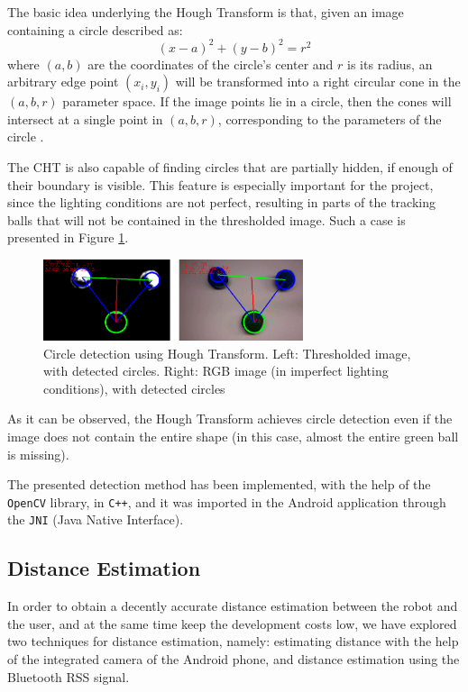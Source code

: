 \documentclass[journal]{IEEEtran}
\let\MYoriglatexcaption\caption
\renewcommand{\caption}[2][\relax]{\MYoriglatexcaption[#2]{#2}}
\begin{document}
The basic idea underlying the Hough Transform is that, given an image containing a circle described as:
%
\begin{equation}
\left(x-a\right)^2 + \left(y-b\right)^2 = r^2
\end{equation}
where $(a,b)$ are the coordinates of the circle's center and $r$ is its radius, an arbitrary edge point $(x_i, y_i)$ will be transformed into a right circular cone in the $(a,b,r)$ parameter space. If the image points lie in a circle, then the cones will intersect at a single point in $(a,b,r)$, corresponding to the parameters of the circle \cite{yuen1990cht}.

The CHT is also capable of finding circles that are partially hidden, if enough of their boundary is visible. This feature is especially important for the project, since the lighting conditions are not perfect, resulting in parts of the tracking balls that will not be contained in the thresholded image. Such a case is presented in Figure \ref{fig:cht}.
%
\begin{figure}[htpb]
 \centering
\includegraphics[width=3in]{images/cht_incomplete}
\caption{Circle detection using Hough Transform. Left: Thresholded image, with detected circles. Right: RGB image (in imperfect lighting conditions), with detected circles}
\label{fig:cht}
\end{figure}
%
As it can be observed, the Hough Transform achieves circle detection even if the image does not contain the entire shape (in this case, almost the entire green ball is missing).

The presented detection method has been implemented, with the help of the \texttt{OpenCV} library, in \texttt{C++}, and it was imported in the Android application through the \texttt{JNI} (Java Native Interface).

\subsection{Distance Estimation}
In order to obtain a decently accurate distance estimation between the robot and the user, and at the same time keep the development costs low, we have explored two techniques for distance estimation, namely: estimating distance with the help of the integrated camera of the Android phone, and distance estimation using the Bluetooth RSS signal.
\end{document}
